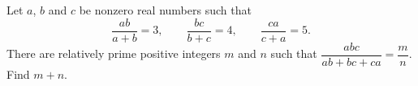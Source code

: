 Let $a$, $b$ and $c$ be nonzero real numbers such that
\[
\dfrac{ab}{a+b}=3,\qquad\dfrac{bc}{b+c}=4,\qquad\dfrac{ca}{c+a}=5 .
\]
There are relatively prime positive integers $m$ and $n$ such that $\dfrac{abc}{ab+bc+ca}=\dfrac {m}{n}$. Find $m+n$.
